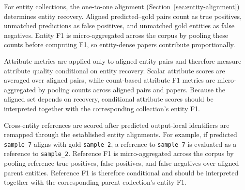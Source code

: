 For entity collections, the one-to-one alignment
(Section~\ref{sec:entity-alignment}) determines entity recovery. Aligned
predicted--gold pairs count as true positives, unmatched predictions as false
positives, and unmatched gold entities as false negatives. Entity F1 is
micro-aggregated across the corpus by pooling these counts before computing
F1, so entity-dense papers contribute proportionally.

Attribute metrics are applied only to aligned entity pairs and therefore
measure attribute quality conditional on entity recovery. Scalar attribute
scores are averaged over aligned pairs, while count-based attribute F1 metrics
are micro-aggregated by pooling counts across aligned pairs and papers. Because
the aligned set depends on recovery, conditional attribute scores should be
interpreted together with the corresponding collection's entity F1.

Cross-entity references are scored after predicted output-local identifiers
are remapped through the established entity alignments. For example, if
predicted \texttt{sample\_7} aligns with gold \texttt{sample\_2}, a reference
to \texttt{sample\_7} is evaluated as a reference to
\texttt{sample\_2}. Reference F1 is micro-aggregated across the corpus by
pooling reference true positives, false positives, and false negatives over
aligned parent entities. Reference F1 is therefore conditional and should be
interpreted together with the corresponding parent collection's entity F1.
